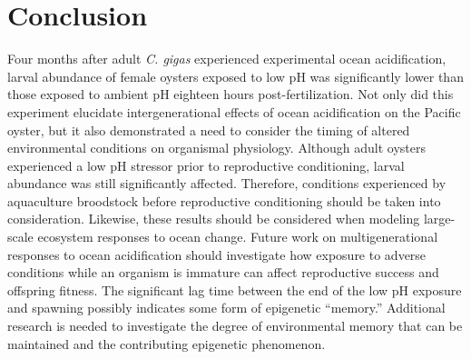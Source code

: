 \documentclass [11pt, proquest] {uwthesis}[2015/03/03]
\begin{document}
\hypertarget{conclusion-1}{%
\section{Conclusion}\label{conclusion-1}}

Four months after adult \emph{C. gigas} experienced experimental ocean acidification, larval abundance of female oysters exposed to low pH was significantly lower than those exposed to ambient pH eighteen hours post-fertilization. Not only did this experiment elucidate intergenerational effects of ocean acidification on the Pacific oyster, but it also demonstrated a need to consider the timing of altered environmental conditions on organismal physiology. Although adult oysters experienced a low pH stressor prior to reproductive conditioning, larval abundance was still significantly affected. Therefore, conditions experienced by aquaculture broodstock before reproductive conditioning should be taken into consideration. Likewise, these results should be considered when modeling large-scale ecosystem responses to ocean change. Future work on multigenerational responses to ocean acidification should investigate how exposure to adverse conditions while an organism is immature can affect reproductive success and offspring fitness. The significant lag time between the end of the low pH exposure and spawning possibly indicates some form of epigenetic ``memory.'' Additional research is needed to investigate the degree of environmental memory that can be maintained and the contributing epigenetic phenomenon.

\clearpage
\end{document}
